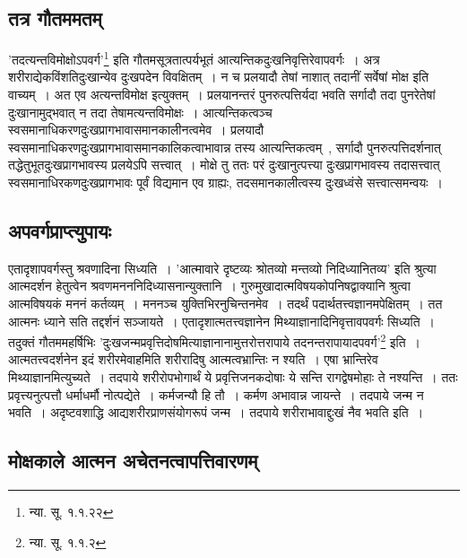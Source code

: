 		\subsection{तत्र गौतममतम्}

		'तदत्यन्तविमोक्षोऽपवर्ग'\footnote{न्या. सू. १.१.२२} इति गौतमसूत्रतात्पर्यभूतं आत्यन्तिकदुःखनिवृत्तिरेवापवर्गः~। अत्र शरीराद्येकविंशतिदुःखान्येव दुःखपदेन विवक्षितम्~। न च प्रलयादौ तेषां नाशात् तदानीं सर्वेषां मोक्ष इति वाच्यम्~। अत एव अत्यन्तविमोक्ष इत्युक्तम्~। प्रलयानन्तरं पुनरुत्पत्तिर्यदा भवति सर्गादौ तदा पुनरेतेषां दुःखानामुद्भवात् न तदा तेषामत्यन्तविमोक्षः~। आत्यन्तिकत्वञ्च स्वसमानाधिकरणदुःखप्रागभावासमानकालीनत्वमेव~। प्रलयादौ स्वसमानाधिकरणदुःखप्रागभावासमानकालिकत्वाभावान्न तस्य आत्यन्तिकत्वम्~, सर्गादौ पुनरुत्पत्तिदर्शनात् तद्धेतुभूतदुःखप्रागभावस्य प्रलयेऽपि सत्त्वात्~। मोक्षे तु ततः परं दुःखानुत्पत्त्या दुःखप्रागभावस्य तदासत्त्वात् स्वसमानाधिरकणदुःखप्रागभावः पूर्वं विद्यमान एव ग्राह्यः, तदसमानकालीत्वस्य दुःखध्वंसे सत्त्वात्समन्वयः~।

		\subsection{अपवर्गप्राप्त्युपायः}

		एतादृशापवर्गस्तु श्रवणादिना सिध्यति~। 'आत्मावारे दृष्टव्यः श्रोतव्यो मन्तव्यो निदिध्यानितव्य' इति श्रुत्या आत्मदर्शन हेतुत्वेन श्रवणमनननिदिध्यासनान्युक्तानि~। गुरुमुखादात्मविषयकोपनिषद्वाक्यानि श्रुत्वा आत्मविषयकं मननं कर्तव्यम्~। मननञ्च युक्तिभिरनुचिन्तनमेव~। तदर्थं पदार्थतत्त्वज्ञानमपेक्षितम्~। तत आत्मनः ध्याने सति तद्दर्शनं सञ्जायते~। एतादृशात्मतत्त्वज्ञानेन मिथ्याज्ञानादिनिवृत्तावपवर्गः सिध्यति~। तदुक्तं गौतममहर्षिभिः 'दुःखजन्मप्रवृत्तिदोषमित्याज्ञानानामुत्तरोत्तरापाये तदनन्तरापायादपवर्ग'\footnote{न्या. सू. १.१.२} इति~। आत्मतत्त्वदर्शनेन इदं शरीरमेवाहमिति शरीरादिषु आत्मत्वभ्रान्तिः न श्यति~। एषा भ्रान्तिरेव मिथ्याज्ञानमित्युच्यते~। तदपाये शरीरोपभोगार्थं ये प्रवृत्तिजनकदोषाः ये सन्ति रागद्वेषमोहाः ते नश्यन्ति~। ततः प्रवृत्त्यनुत्पत्तौ धर्माधर्मौ नोत्पद्येते~। कर्मजन्यौ हि तौ~। कर्मण अभावान्न जायन्ते~। तदपाये जन्म न भवति~। अदृष्टवशाद्धि आद्यशरीरप्राणसंयोगरूपं जन्म~। तदपाये शरीराभावाद्दुःखं नैव भवति इति~।

		\subsection{मोक्षकाले आत्मन अचेतनत्वापत्तिवारणम्}

